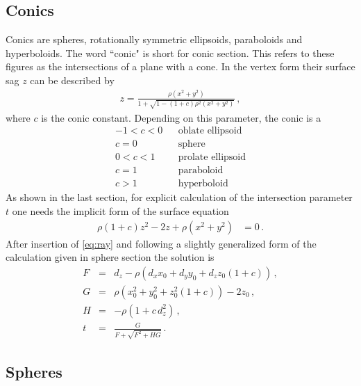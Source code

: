 \documentclass[12pt,a4paper,twoside,openright,BCOR10mm,headsepline,titlepage,abstracton,chapterprefix,final]{scrreprt}
\begin{document}
\subsection{Conics}
Conics are spheres, rotationally symmetric ellipsoids, paraboloids and hyperboloids.
The word ``conic" is short for conic section. This refers to these figures as the
intersections of a plane with a cone.
In the vertex form their surface sag $z$ can be described by
\begin{eqnarray}
 z =  \frac
 { \rho ( x^2 + y^2 ) }
 { 1 + \sqrt{1 - (1+c) \rho^2  (x^2 + y^2)} }\,,
\end{eqnarray}
where $c$ is the conic constant. Depending on this parameter, the conic is a
\begin{eqnarray*}
-1 < c < 0 && \textrm{oblate ellipsoid} \\
     c = 0 && \textrm{sphere} \\
 0 < c < 1 && \textrm{prolate ellipsoid} \\
     c = 1 && \textrm{paraboloid} \\
     c > 1 && \textrm{hyperboloid}
\end{eqnarray*}
As shown in the last section, for explicit calculation of the intersection parameter $t$ one
needs the implicit form of the surface equation
\begin{align}
 \rho (1 + c) z^2 - 2 z + \rho (x^2 + y^2) &=0\,.
\end{align}
After insertion of \eqref{eq:ray} and following a slightly generalized form of the calculation
given in sphere section the solution is
\begin{subequations}
\label{eq:intersectionconicsection}
\begin{eqnarray}
   F &=& d_z - \rho \left( d_x x_0 + d_y y_0 + d_z z_0 (1+c) \right)\,, \\
   G &=& \rho (x_0^2 + y_0^2 + z_0^2 (1+c)) - 2 z_0\,, \\
   H &=& - \rho ( 1 + c \, d_z^2 )\,, \\
   t &=& \frac{G}{ F + \sqrt{F^2 + H G} }\,.
\end{eqnarray}
\end{subequations}



\subsection{Spheres}
\label{subsection:spheres}
\end{document}
